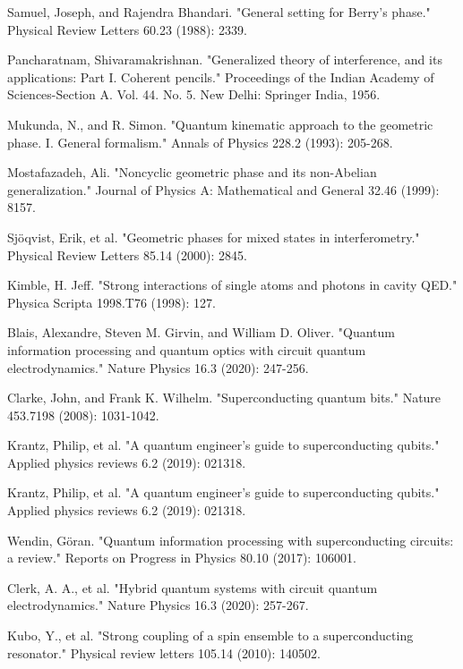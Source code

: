 \begin{thebibliography}{9}
Samuel, Joseph, and Rajendra Bhandari. "General setting for Berry's phase." Physical Review Letters 60.23 (1988): 2339.


Pancharatnam, Shivaramakrishnan. "Generalized theory of interference, and its applications: Part I. Coherent pencils." Proceedings of the Indian Academy of Sciences-Section A. Vol. 44. No. 5. New Delhi: Springer India, 1956.

Mukunda, N., and R. Simon. "Quantum kinematic approach to the geometric phase. I. General formalism." Annals of Physics 228.2 (1993): 205-268.

Mostafazadeh, Ali. "Noncyclic geometric phase and its non-Abelian generalization." Journal of Physics A: Mathematical and General 32.46 (1999): 8157.

Sjöqvist, Erik, et al. "Geometric phases for mixed states in interferometry." Physical Review Letters 85.14 (2000): 2845.


Kimble, H. Jeff. "Strong interactions of single atoms and photons in cavity QED." Physica Scripta 1998.T76 (1998): 127.

Blais, Alexandre, Steven M. Girvin, and William D. Oliver. "Quantum information processing and quantum optics with circuit quantum electrodynamics." Nature Physics 16.3 (2020): 247-256.

Clarke, John, and Frank K. Wilhelm. "Superconducting quantum bits." Nature 453.7198 (2008): 1031-1042.

Krantz, Philip, et al. "A quantum engineer's guide to superconducting qubits." Applied physics reviews 6.2 (2019): 021318.

Krantz, Philip, et al. "A quantum engineer's guide to superconducting qubits." Applied physics reviews 6.2 (2019): 021318.

Wendin, Göran. "Quantum information processing with superconducting circuits: a review." Reports on Progress in Physics 80.10 (2017): 106001.

Clerk, A. A., et al. "Hybrid quantum systems with circuit quantum electrodynamics." Nature Physics 16.3 (2020): 257-267.

Kubo, Y., et al. "Strong coupling of a spin ensemble to a superconducting resonator." Physical review letters 105.14 (2010): 140502.


\end{thebibliography}
